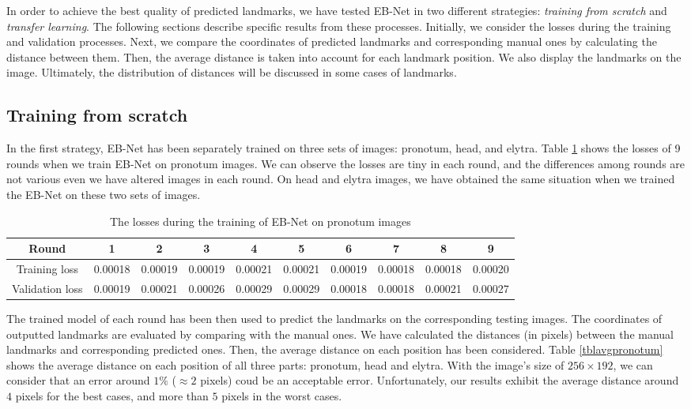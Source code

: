 \documentclass[review]{elsarticle}
\begin{document}
In order to achieve the best quality of predicted landmarks, we have tested EB-Net in two different strategies: \textit{training from scratch} and \textit{transfer learning}. The following sections describe specific results from these processes. Initially, we consider the losses during the training and validation processes. Next, we compare the coordinates of predicted landmarks and corresponding manual ones by calculating the distance between them. Then, the average distance is taken into account for each landmark position. We also display the landmarks on the image. Ultimately, the distribution of distances will be discussed in some cases of landmarks. 

\subsection{Training from scratch}
In the first strategy, EB-Net has been separately trained on three sets of images: pronotum, head, and elytra. Table \ref{tbltrainingloss} shows the losses of 9 rounds when we train EB-Net on pronotum images. We can observe the losses are tiny in each round, and the differences among rounds are not various even we have altered images in each round. On head and elytra images, we have obtained the same situation when we trained the EB-Net on these two sets of images.

\begin{table}[h!]
	\centering
	\begin{tabular}{| c | c | c | c | c | c | c | c | c | c |}
	\hline
	Round & 1 & 2 & 3 & 4 & 5 & 6 & 7 & 8 & 9 \\ \hline
Training loss & 0.00018 & 0.00019 & 0.00019 & 0.00021 & 0.00021 & 0.00019 & 0.00018 & 0.00018 & 0.00020 \\ \hline
Validation loss & 0.00019 & 0.00021 & 0.00026 & 0.00029 & 0.00029 & 0.00018 & 0.00018 & 0.00021 & 0.00027 \\ \hline
	\end{tabular}
	\caption{The losses during the training of EB-Net on pronotum images}
	\label{tbltrainingloss}
\end{table}

The trained model of each round has been then used to predict the landmarks on the corresponding testing images. The coordinates of outputted landmarks are evaluated by comparing with the manual ones. We have calculated the distances (in pixels) between the manual landmarks and corresponding predicted ones. Then, the average distance on each position has been considered. Table \ref{tblavgpronotum} shows the average distance on each position of all three parts: pronotum, head and elytra. With the image's size of $256 \times 192$, we can consider that an error around $1\%$ ($\approx 2$ pixels) coud be an acceptable error. Unfortunately, our results exhibit the average distance around $4$ pixels for the best cases, and more than $5$ pixels in the worst cases.
\end{document}
